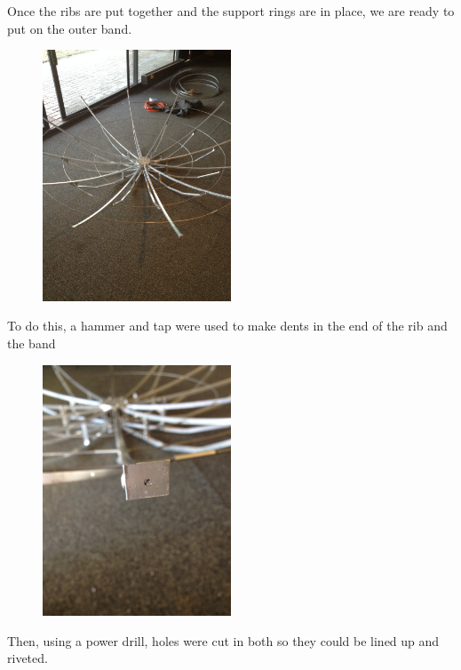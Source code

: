 \documentclass[11pt]{article} %
\begin{document}
Once the ribs are put together and the support rings are in place, we are ready to put on the outer band.

\begin{figure}
  \centering
  \caption{   }
  \includegraphics[width=0.50\textwidth]{dish/04.jpeg}
\end{figure}

To do this, a hammer and tap were used to make dents in the end of the rib and the band

\begin{figure}
  \centering
  \caption{   }
  \includegraphics[width=0.50\textwidth]{dish/05.jpeg}
\end{figure}

Then, using a power drill, holes were cut in both so they could be lined up and riveted.
\end{document}
